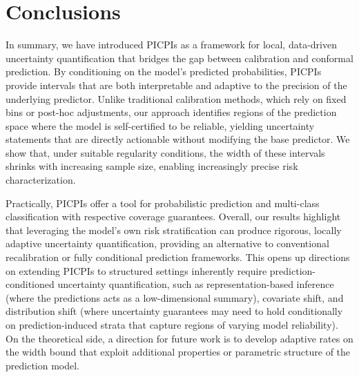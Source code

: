 \documentclass[11pt]{article}
\theoremstyle{statplain}
\theoremstyle{statdefinition}
\DeclareMathOperator{\test}{test}
\newcommand{\PP}{\mathbb{P}}
\newcommand{\0}{\mathbf{0}}
\newcommand{\I}{\mathcal{I}}
\newcommand{\titleShorts}{PICPIs\xspace}
\begin{document}
\section{Conclusions}
\label{sec:conclusions}

In summary, we have introduced \titleShorts as a framework for local, data-driven uncertainty quantification that bridges the gap between calibration and conformal prediction. By conditioning on the model’s predicted probabilities, \titleShorts provide intervals that are both interpretable and adaptive to the precision of the underlying predictor. Unlike traditional calibration methods, which rely on fixed bins or post-hoc adjustments, our approach identifies regions of the prediction space where the model is self-certified to be reliable, yielding uncertainty statements that are directly actionable without modifying the base predictor. We show that, under suitable regularity conditions, the width of these intervals shrinks with increasing sample size, enabling increasingly precise risk characterization. 

Practically, \titleShorts offer a tool for probabilistic prediction and multi-class classification with respective coverage guarantees. Overall, our results highlight that leveraging the model’s own risk stratification can produce rigorous, locally adaptive uncertainty quantification, providing an alternative to conventional recalibration or fully conditional prediction frameworks. This opens up directions on extending \titleShorts to structured settings inherently require prediction-conditioned uncertainty quantification, such as representation-based inference (where the predictions acts as a low-dimensional summary), covariate shift, and distribution shift (where uncertainty guarantees may need to hold conditionally on prediction-induced strata that capture regions of varying model reliability). On the theoretical side, a direction for future work is to develop adaptive rates on the width bound that exploit additional properties or parametric structure of the prediction model. 



\end{document}
